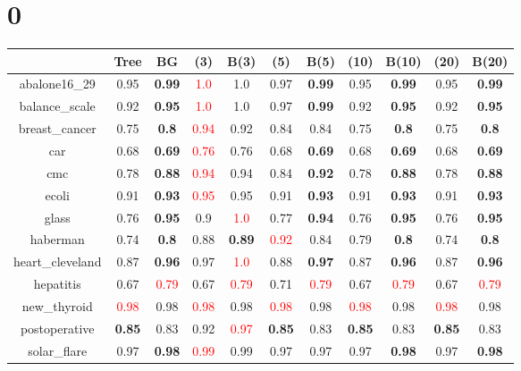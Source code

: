 \documentclass{article}%
\begin{document}
%
\normalsize%
\section*{0}%
\begin{tabular}{c|cccccccccc}%
\hline%
&Tree&BG&(3)&B(3)&(5)&B(5)&(10)&B(10)&(20)&B(20)\\%
\hline%
abalone16\_29&0.95&\textbf{0.99}&\textcolor{red}{ 
1.0
}&1.0&0.97&\textbf{0.99}&0.95&\textbf{0.99}&0.95&\textbf{0.99}\\%
\hline%
balance\_scale&0.92&\textbf{0.95}&\textcolor{red}{ 
1.0
}&1.0&0.97&\textbf{0.99}&0.92&\textbf{0.95}&0.92&\textbf{0.95}\\%
\hline%
breast\_cancer&0.75&\textbf{0.8}&\textcolor{red}{ 
0.94
}&0.92&0.84&0.84&0.75&\textbf{0.8}&0.75&\textbf{0.8}\\%
\hline%
car&0.68&\textbf{0.69}&\textcolor{red}{ 
0.76
}&0.76&0.68&\textbf{0.69}&0.68&\textbf{0.69}&0.68&\textbf{0.69}\\%
\hline%
cmc&0.78&\textbf{0.88}&\textcolor{red}{ 
0.94
}&0.94&0.84&\textbf{0.92}&0.78&\textbf{0.88}&0.78&\textbf{0.88}\\%
\hline%
ecoli&0.91&\textbf{0.93}&\textcolor{red}{ 
0.95
}&0.95&0.91&\textbf{0.93}&0.91&\textbf{0.93}&0.91&\textbf{0.93}\\%
\hline%
glass&0.76&\textbf{0.95}&0.9&\textcolor{red}{ 
1.0
}&0.77&\textbf{0.94}&0.76&\textbf{0.95}&0.76&\textbf{0.95}\\%
\hline%
haberman&0.74&\textbf{0.8}&0.88&\textbf{0.89}&\textcolor{red}{ 
0.92
}&0.84&0.79&\textbf{0.8}&0.74&\textbf{0.8}\\%
\hline%
heart\_cleveland&0.87&\textbf{0.96}&0.97&\textcolor{red}{ 
1.0
}&0.88&\textbf{0.97}&0.87&\textbf{0.96}&0.87&\textbf{0.96}\\%
\hline%
hepatitis&0.67&\textcolor{red}{ 
0.79
}&0.67&\textcolor{red}{ 
0.79
}&0.71&\textcolor{red}{ 
0.79
}&0.67&\textcolor{red}{ 
0.79
}&0.67&\textcolor{red}{ 
0.79
}\\%
\hline%
new\_thyroid&\textcolor{red}{ 
0.98
}&0.98&\textcolor{red}{ 
0.98
}&0.98&\textcolor{red}{ 
0.98
}&0.98&\textcolor{red}{ 
0.98
}&0.98&\textcolor{red}{ 
0.98
}&0.98\\%
\hline%
postoperative&\textbf{0.85}&0.83&0.92&\textcolor{red}{ 
0.97
}&\textbf{0.85}&0.83&\textbf{0.85}&0.83&\textbf{0.85}&0.83\\%
\hline%
solar\_flare&0.97&\textbf{0.98}&\textcolor{red}{ 
0.99
}&0.99&0.97&0.97&0.97&\textbf{0.98}&0.97&\textbf{0.98}\\%
\hline%

\end{tabular}
\end{document}
